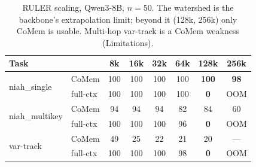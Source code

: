 \begin{table}[t]
\centering
\small
\begin{tabular}{@{}llcccccc@{}}
\toprule
\textbf{Task} & & 8k & 16k & 32k & 64k & 128k & 256k \\
\midrule
\multirow{2}{*}{niah\_single} & CoMem & 100 & 100 & 100 & 100 & \textbf{100} & \textbf{98} \\
 & full-ctx & 100 & 100 & 100 & 100 & \textbf{0} & OOM \\
\multirow{2}{*}{niah\_multikey} & CoMem & 94 & 94 & 94 & 82 & 84 & 60 \\
 & full-ctx & 100 & 100 & 100 & 96 & \textbf{0} & OOM \\
\multirow{2}{*}{var-track} & CoMem & 49 & 25 & 22 & 21 & 20 & --- \\
 & full-ctx & 100 & 100 & 100 & 98 & \textbf{0} & OOM \\
\bottomrule
\end{tabular}
\caption{RULER scaling, Qwen3-8B, $n{=}50$. The watershed is the backbone's extrapolation limit; beyond it (128k, 256k) only CoMem is usable. Multi-hop var-track is a CoMem weakness (Limitations).}
\label{tab:scaling}
\end{table}
